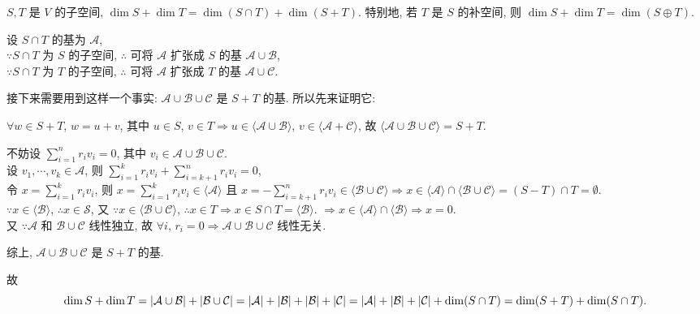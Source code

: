\documentclass{note}
\begin{document}
\begin{thm}[(课本定理 1.14)]
    $S,T$ 是 $V$ 的子空间, $\dim S+\dim T=\dim(S\cap T)+\dim(S+T)$. 特别地, 若 $T$ 是 $S$ 的补空间, 则 $\dim S+\dim T=\dim(S\oplus T)$.
\end{thm}
\begin{pf}
    设 $S\cap T$ 的基为 $\mathcal{A}$,\\
    $\because S\cap T$ 为 $S$ 的子空间, $\therefore$ 可将 $\mathcal{A}$ 扩张成 $S$ 的基 $\mathcal{A}\cup\mathcal{B}$,\\
    $\because S\cap T$ 为 $T$ 的子空间, $\therefore$ 可将 $\mathcal{A}$ 扩张成 $T$ 的基 $\mathcal{A}\cup\mathcal{C}$.

    接下来需要用到这样一个事实: $\mathcal{A}\cup\mathcal{B}\cup\mathcal{C}$ 是 $S+T$ 的基. 所以先来证明它:
    \begin{pf}
        $\forall w\in S+T$, $w=u+v$, 其中 $u\in S$, $v\in T\Longrightarrow u\in \langle\mathcal{A}\cup\mathcal{B}\rangle$, $v\in\langle\mathcal{A}+\mathcal{C}\rangle$, 故 $\langle\mathcal{A}\cup\mathcal{B}\cup\mathcal{C}\rangle=S+T$.

        不妨设 $\sum_{i=1}^nr_iv_i=0$, 其中 $v_i\in\mathcal{A}\cup\mathcal{B}\cup\mathcal{C}$.\\
        设 $v_1,\cdots,v_k\in\mathcal{A}$, 则 $\sum_{i=1}^kr_iv_i+\sum_{i=k+1}^nr_iv_i=0$,\\
        令 $x=\sum_{i=1}^kr_iv_i$, 则 $x=\sum_{i=1}^kr_iv_i\in\langle\mathcal{A}\rangle$ 且 $x=-\sum_{i=k+1}^nr_iv_i\in\langle\mathcal{B}\cup\mathcal{C}\rangle\Longrightarrow x\in\langle\mathcal{A}\rangle\cap\langle\mathcal{B}\cup\mathcal{C}\rangle=(S-T)\cap T=\emptyset$.\\
        $\because x\in\langle\mathcal{B}\rangle$, $\therefore x\in\mathcal{S}$, 又 $\because x\in \langle\mathcal{B}\cup\mathcal{C}\rangle$, $\therefore x\in T\Longrightarrow x\in S\cap T=\langle\mathcal{B}\rangle$.
        $\Longrightarrow x\in\langle\mathcal{A}\rangle\cap\langle\mathcal{B}\rangle\Longrightarrow x=0$.\\
        又 $\because\mathcal{A}$ 和 $\mathcal{B}\cup\mathcal{C}$ 线性独立, 故 $\forall i$, $r_i=0\Longrightarrow\mathcal{A}\cup\mathcal{B}\cup\mathcal{C}$ 线性无关.

        综上, $\mathcal{A}\cup\mathcal{B}\cup\mathcal{C}$ 是 $S+T$ 的基.
    \end{pf}

    故 $$\dim S+\dim T=\left\lvert\mathcal{A}\cup\mathcal{B}\right\rvert+\left\lvert\mathcal{B}\cup\mathcal{C}\right\rvert=\left\lvert\mathcal{A}\right\rvert+\left\lvert\mathcal{B}\right\rvert+\left\lvert\mathcal{B}\right\rvert+\left\lvert\mathcal{C}\right\rvert=\left\lvert\mathcal{A}\right\rvert+\left\lvert\mathcal{B}\right\rvert+\left\lvert\mathcal{C}\right\rvert+\dim(S\cap T)=\dim(S+T)+\dim(S\cap T).$$
\end{pf}
\end{document}
